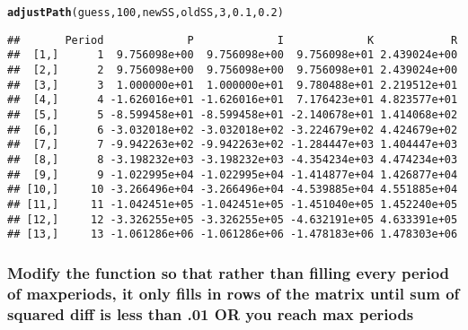 \documentclass{article}\usepackage[]{graphicx}\usepackage[]{color}
\makeatletter
\newcommand{\hlnum}[1]{\textcolor[rgb]{0.686,0.059,0.569}{#1}}%
\newcommand{\hlstd}[1]{\textcolor[rgb]{0.345,0.345,0.345}{#1}}%
\newcommand{\hlkwd}[1]{\textcolor[rgb]{0.737,0.353,0.396}{\textbf{#1}}}%
\newenvironment{kframe}{%
 \def\at@end@of@kframe{}%
 \ifinner\ifhmode%
  \def\at@end@of@kframe{\end{minipage}}%
  \begin{minipage}{\columnwidth}%
 \fi\fi%
 \def\FrameCommand##1{\hskip\@totalleftmargin \hskip-\fboxsep
 \colorbox{shadecolor}{##1}\hskip-\fboxsep
     \hskip-\linewidth \hskip-\@totalleftmargin \hskip\columnwidth}%
 \MakeFramed {\advance\hsize-\width
   \@totalleftmargin\z@ \linewidth\hsize
   \@setminipage}}%
 {\par\unskip\endMakeFramed%
 \at@end@of@kframe}
\newenvironment{knitrout}{}{} %
\makeatother
\begin{document}
\begin{knitrout}
\begin{kframe}
\begin{alltt}
\hlkwd{adjustPath}\hlstd{(guess,} \hlnum{100}\hlstd{, newSS, oldSS,} \hlnum{3}\hlstd{,} \hlnum{0.1}\hlstd{,} \hlnum{0.2}\hlstd{)}
\end{alltt}
\begin{verbatim}
##       Period             P             I             K            R
##  [1,]      1  9.756098e+00  9.756098e+00  9.756098e+01 2.439024e+00
##  [2,]      2  9.756098e+00  9.756098e+00  9.756098e+01 2.439024e+00
##  [3,]      3  1.000000e+01  1.000000e+01  9.780488e+01 2.219512e+01
##  [4,]      4 -1.626016e+01 -1.626016e+01  7.176423e+01 4.823577e+01
##  [5,]      5 -8.599458e+01 -8.599458e+01 -2.140678e+01 1.414068e+02
##  [6,]      6 -3.032018e+02 -3.032018e+02 -3.224679e+02 4.424679e+02
##  [7,]      7 -9.942263e+02 -9.942263e+02 -1.284447e+03 1.404447e+03
##  [8,]      8 -3.198232e+03 -3.198232e+03 -4.354234e+03 4.474234e+03
##  [9,]      9 -1.022995e+04 -1.022995e+04 -1.414877e+04 1.426877e+04
## [10,]     10 -3.266496e+04 -3.266496e+04 -4.539885e+04 4.551885e+04
## [11,]     11 -1.042451e+05 -1.042451e+05 -1.451040e+05 1.452240e+05
## [12,]     12 -3.326255e+05 -3.326255e+05 -4.632191e+05 4.633391e+05
## [13,]     13 -1.061286e+06 -1.061286e+06 -1.478183e+06 1.478303e+06
\end{verbatim}
\end{kframe}
\end{knitrout}

\subsubsection{Modify the function so that rather than filling every period of maxperiods, it only fills in rows of the matrix until sum of squared diff is less than .01 OR you reach max periods}
\end{document}
